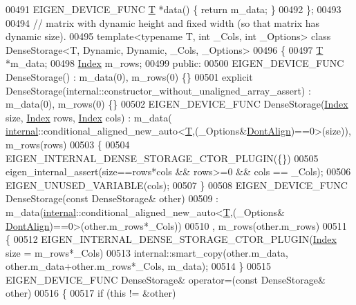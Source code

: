 \begin{DoxyCode}
00491     EIGEN\_DEVICE\_FUNC \hyperlink{group___sparse_core___module_class_eigen_1_1_triplet}{T} *data() \{ \textcolor{keywordflow}{return} m\_data; \}
00492 \};
00493 
00494 \textcolor{comment}{// matrix with dynamic height and fixed width (so that matrix has dynamic size).}
00495 \textcolor{keyword}{template}<\textcolor{keyword}{typename} T, \textcolor{keywordtype}{int} \_Cols, \textcolor{keywordtype}{int} \_Options> \textcolor{keyword}{class }DenseStorage<T, Dynamic, Dynamic, \_Cols, \_Options>
00496 \{
00497     \hyperlink{group___sparse_core___module_class_eigen_1_1_triplet}{T} *m\_data;
00498     \hyperlink{namespace_eigen_a62e77e0933482dafde8fe197d9a2cfde}{Index} m\_rows;
00499   \textcolor{keyword}{public}:
00500     EIGEN\_DEVICE\_FUNC DenseStorage() : m\_data(0), m\_rows(0) \{\}
00501     \textcolor{keyword}{explicit} DenseStorage(internal::constructor\_without\_unaligned\_array\_assert) : m\_data(0), m\_rows(0) \{\}
00502     EIGEN\_DEVICE\_FUNC DenseStorage(\hyperlink{namespace_eigen_a62e77e0933482dafde8fe197d9a2cfde}{Index} size, \hyperlink{namespace_eigen_a62e77e0933482dafde8fe197d9a2cfde}{Index} rows, \hyperlink{namespace_eigen_a62e77e0933482dafde8fe197d9a2cfde}{Index} cols) : m\_data(
      \hyperlink{namespaceinternal}{internal}::conditional\_aligned\_new\_auto<\hyperlink{group___sparse_core___module_class_eigen_1_1_triplet}{T},(\_Options&\hyperlink{group__enums_ggaacded1a18ae58b0f554751f6cdf9eb13a40a452614141522dd313363dbbd65726}{DontAlign})==0>(size)), m\_rows(rows)
00503     \{
00504       EIGEN\_INTERNAL\_DENSE\_STORAGE\_CTOR\_PLUGIN(\{\})
00505       eigen\_internal\_assert(size==rows*cols && rows>=0 && cols == \_Cols);
00506       EIGEN\_UNUSED\_VARIABLE(cols);
00507     \}
00508     EIGEN\_DEVICE\_FUNC DenseStorage(\textcolor{keyword}{const} DenseStorage& other)
00509       : m\_data(\hyperlink{namespaceinternal}{internal}::conditional\_aligned\_new\_auto<\hyperlink{group___sparse_core___module_class_eigen_1_1_triplet}{T},(\_Options&
      \hyperlink{group__enums_ggaacded1a18ae58b0f554751f6cdf9eb13a40a452614141522dd313363dbbd65726}{DontAlign})==0>(other.m\_rows*\_Cols))
00510       , m\_rows(other.m\_rows)
00511     \{
00512       EIGEN\_INTERNAL\_DENSE\_STORAGE\_CTOR\_PLUGIN(\hyperlink{namespace_eigen_a62e77e0933482dafde8fe197d9a2cfde}{Index} size = m\_rows*\_Cols)
00513       internal::smart\_copy(other.m\_data, other.m\_data+other.m\_rows*\_Cols, m\_data);
00514     \}
00515     EIGEN\_DEVICE\_FUNC DenseStorage& operator=(\textcolor{keyword}{const} DenseStorage& other)
00516     \{
00517       \textcolor{keywordflow}{if} (\textcolor{keyword}{this} != &other)

\end{DoxyCode}
